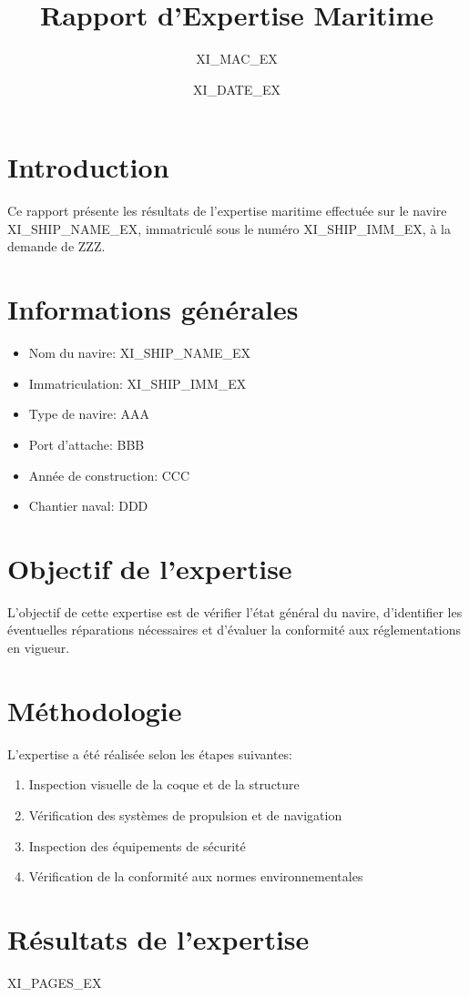 \documentclass[12pt,a4paper]{article}
\title{Rapport d'Expertise Maritime}
\author{XI_MAC_EX}
\date{{\Large XI_DATE_EX}}
\begin{document}
\maketitle
\tableofcontents
\newpage

\section{Introduction}
Ce rapport présente les résultats de l'expertise maritime effectuée sur le navire XI_SHIP_NAME_EX, immatriculé sous le numéro XI_SHIP_IMM_EX, à la demande de ZZZ.

\section{Informations générales}
\begin{itemize}
    \item Nom du navire: XI_SHIP_NAME_EX
    \item Immatriculation: XI_SHIP_IMM_EX
    \item Type de navire: AAA
    \item Port d'attache: BBB
    \item Année de construction: CCC
    \item Chantier naval: DDD
\end{itemize}

\section{Objectif de l'expertise}
L'objectif de cette expertise est de vérifier l'état général du navire, d'identifier les éventuelles réparations nécessaires et d'évaluer la conformité aux réglementations en vigueur.

\section{Méthodologie}
L'expertise a été réalisée selon les étapes suivantes:
\begin{enumerate}
    \item Inspection visuelle de la coque et de la structure
    \item Vérification des systèmes de propulsion et de navigation
    \item Inspection des équipements de sécurité
    \item Vérification de la conformité aux normes environnementales
\end{enumerate}

\newpage
\section{Résultats de l'expertise}
XI_PAGES_EX
\end{document}
